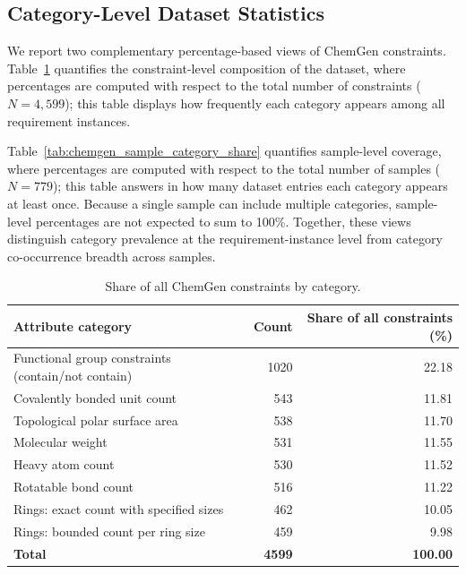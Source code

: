 \documentclass[10pt]{article} %
\begin{document}
    \subsection{Category-Level Dataset Statistics}
    \label{app:chemgen_category_stats}
    We report two complementary percentage-based views of ChemGen constraints. Table~\ref{tab:chemgen_constraint_category_share} quantifies the constraint-level composition of the dataset, where percentages are computed with respect to the total number of constraints ($N=4{,}599$); this table displays how frequently each category appears among all requirement instances. 
    
    Table~\ref{tab:chemgen_sample_category_share} quantifies sample-level coverage, where percentages are computed with respect to the total number of samples ($N=779$); this table answers in how many dataset entries each category appears at least once. Because a single sample can include multiple categories, sample-level percentages are not expected to sum to 100\%. Together, these views distinguish category prevalence at the requirement-instance level from category co-occurrence breadth across samples.

    \begin{table}[h]
        \centering
        \small
        \begin{tabular}{lrr}
            \toprule
            \textbf{Attribute category} & \textbf{Count} & \textbf{Share of all constraints (\%)} \\
            \midrule
            Functional group constraints (contain/not contain) & 1020 & 22.18 \\
            Covalently bonded unit count & 543 & 11.81 \\
            Topological polar surface area & 538 & 11.70 \\
            Molecular weight & 531 & 11.55 \\
            Heavy atom count & 530 & 11.52 \\
            Rotatable bond count & 516 & 11.22 \\
            Rings: exact count with specified sizes & 462 & 10.05 \\
            Rings: bounded count per ring size & 459 & 9.98 \\
            \midrule
            \textbf{Total} & \textbf{4599} & \textbf{100.00} \\
            \bottomrule
        \end{tabular}
        \caption{Share of all ChemGen constraints by category.}
        \label{tab:chemgen_constraint_category_share}
    \end{table}
\end{document}
